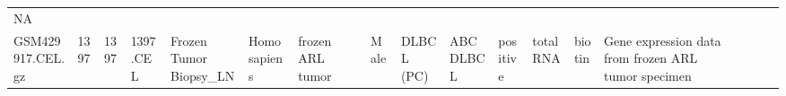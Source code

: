 \documentclass[]{article}
\begin{document}
\begin{longtable}[]{@{}lllllllrllllllllll@{}}
\begin{minipage}[t]{0.01\columnwidth}
NA\strut
\end{minipage}\tabularnewline
\begin{minipage}[t]{0.03\columnwidth}\raggedright
GSM429917.CEL.gz\strut
\end{minipage} & \begin{minipage}[t]{0.02\columnwidth}\raggedright
1397\strut
\end{minipage} & \begin{minipage}[t]{0.01\columnwidth}\raggedright
1397\strut
\end{minipage} & \begin{minipage}[t]{0.02\columnwidth}\raggedright
1397.CEL\strut
\end{minipage} & \begin{minipage}[t]{0.06\columnwidth}\raggedright
Frozen Tumor Biopsy\_LN\strut
\end{minipage} & \begin{minipage}[t]{0.02\columnwidth}\raggedright
Homo sapiens\strut
\end{minipage} & \begin{minipage}[t]{0.04\columnwidth}\raggedright
frozen ARL tumor\strut
\end{minipage} & \begin{minipage}[t]{0.05\columnwidth}\raggedleft
43\strut
\end{minipage} & \begin{minipage}[t]{0.04\columnwidth}\raggedright
Male\strut
\end{minipage} & \begin{minipage}[t]{0.06\columnwidth}\raggedright
DLBCL (PC)\strut
\end{minipage} & \begin{minipage}[t]{0.06\columnwidth}\raggedright
ABC DLBCL\strut
\end{minipage} & \begin{minipage}[t]{0.04\columnwidth}\raggedright
positive\strut
\end{minipage} & \begin{minipage}[t]{0.02\columnwidth}\raggedright
total RNA\strut
\end{minipage} & \begin{minipage}[t]{0.01\columnwidth}\raggedright
biotin\strut
\end{minipage} & \begin{minipage}[t]{0.08\columnwidth}\raggedright
Gene expression data from frozen ARL tumor specimen\strut
\end{minipage} & \begin{minipage}[t]{0.01\columnwidth}\raggedright

\end{minipage}
\end{longtable}
\end{document}
